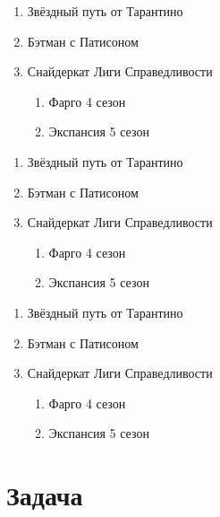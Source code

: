 \documentclass[12pt, a4paper]{article}
\theoremstyle{plain}  %
\theoremstyle{definition} %
\begin{document}
\begin{enumerate}
    \item Звёздный путь от Тарантино 
    \item Бэтман с Патисоном
    \item Снайдеркат Лиги Справедливости 
    \begin{enumerate}
        \item Фарго 4 сезон
        \item Экспансия 5 сезон
    \end{enumerate}
\end{enumerate}

\vspace{2cm} 


\begin{enumerate}
    \renewcommand{\labelenumi}{[\Roman{enumi}]}
    \renewcommand{\labelenumii}{\alph{enumii})}
    
    \item Звёздный путь от Тарантино 
    \item Бэтман с Патисоном
    \item Снайдеркат Лиги Справедливости 
    \begin{enumerate}
        \item Фарго 4 сезон
        \item Экспансия 5 сезон
    \end{enumerate}
\end{enumerate}

\vspace{2cm} 


\begin{enumerate}
    \item Звёздный путь от Тарантино 
    \item Бэтман с Патисоном
    \item Снайдеркат Лиги Справедливости 
    \begin{enumerate}
        \item Фарго 4 сезон
        \item Экспансия 5 сезон
    \end{enumerate}
\end{enumerate}


\section{Задача}
\end{document}
